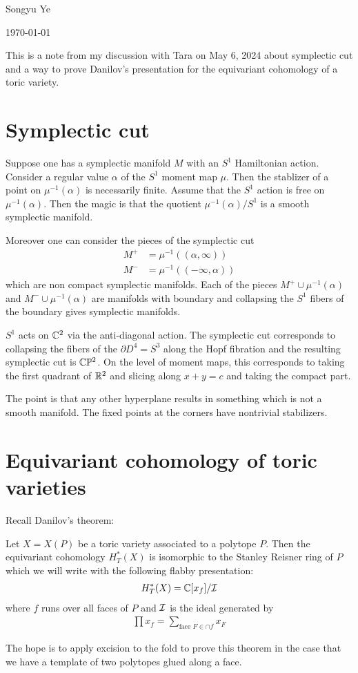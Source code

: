\documentclass[12pt]{article}
\begin{document}
Songyu Ye

\today

This is a note from my discussion with Tara on May 6, 2024 about symplectic cut
and a way to prove Danilov's presentation for the equivariant cohomology of 
a toric variety.

\section{Symplectic cut}

Suppose one has a symplectic manifold $M$ with an $S^1$ Hamiltonian action.
Consider a regular value $\alpha$ of the $S^1$ moment map $\mu$.
Then the stablizer of a point on $\mu^{-1}(\alpha)$ is necessarily finite. 
Assume that the $S^1$ action is free on $\mu^{-1}(\alpha)$. Then the magic
is that the quotient $\mu^{-1}(\alpha)/S^1$ is a smooth symplectic manifold.

Moreover one can consider the pieces of the symplectic cut \begin{align*}
    M^+ &= \mu^{-1}((\alpha, \infty)) \\ 
    M^- &= \mu^{-1}((-\infty, \alpha)) 
\end{align*} which are non compact symplectic manifolds.
Each of the pieces $M^+ \cup \mu^{-1}(\alpha)$ and $ M^- \cup \mu^{-1}(\alpha)$ are manifolds
with boundary and collapsing the $S^1$ fibers of the boundary gives symplectic manifolds.

\begin{example}
    $S^1$ acts on $\mathbb{C}^2$ via the anti-diagonal action. The symplectic cut corresponds to collapsing
    the fibers of the $\partial D^4 = S^3$ along the Hopf fibration and the resulting symplectic cut
    is $\mathbb{C} \mathbb{P}^2$. On the level of moment maps, this corresponds to taking the first
    quadrant of $\mathbb{R}^2$ and slicing along $x + y = c$ and taking the compact part.

    \hfill

    The point is that any other hyperplane results in something which is not 
    a smooth manifold. The fixed points at the corners have nontrivial stabilizers.
\end{example}

\section{Equivariant cohomology of toric varieties}
Recall Danilov's theorem: \begin{theorem}
    Let $X = X(P)$ be a toric variety associated to a polytope $P$.
    Then the equivariant cohomology $H_T^*(X)$ is isomorphic to the Stanley Reisner ring of $P$
    which we will write with the following flabby presentation: \begin{align*}
        H_T^*(X) = \mathbb{C}[x_f]/{\mathcal{I}}
    \end{align*} where $f$ runs over all faces of $P$ and ${\mathcal{I}}$ is the ideal generated by
    \begin{align*}
        \prod x_f = \sum_{\text{face } F \in \cap f} x_F
    \end{align*}
\end{theorem}
The hope is to apply excision to the fold to prove this theorem in 
the case that we have a template of two polytopes glued along a face.
\end{document}
